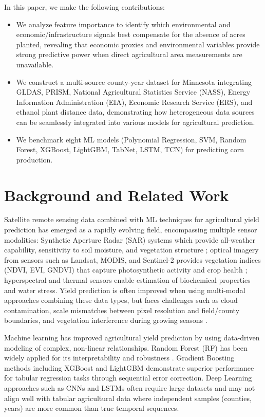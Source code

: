 \documentclass[twocolumn]{article}
\begin{document}
In this paper, we make the following contributions:
\begin{itemize}
    \item We analyze feature importance to identify which environmental and economic/infrastructure signals best compensate for the absence of acres planted, revealing that economic proxies and environmental variables provide strong predictive power when direct agricultural area measurements are unavailable.
    \item We construct a multi-source county-year dataset for Minnesota integrating GLDAS, PRISM, National Agricultural Statistics Service (NASS), Energy Information Administration (EIA), Economic Research Service (ERS), and ethanol plant distance data, demonstrating how heterogeneous data sources can be seamlessly integrated into various models for agricultural prediction.
    \item We benchmark eight ML models (Polynomial Regression, SVM, Random Forest, XGBoost, LightGBM, TabNet, LSTM, TCN) for predicting corn production.
\end{itemize}

\section{Background and Related Work}

Satellite remote sensing data combined with ML techniques for agricultural yield prediction has emerged as a rapidly evolving field, encompassing multiple sensor modalities: Synthetic Aperture Radar (SAR) systems which provide all-weather capability, sensitivity to soil moisture, and vegetation structure \cite{roy2025, sentinel2025}; optical imagery from sensors such as Landsat, MODIS, and Sentinel-2 provides vegetation indices (NDVI, EVI, GNDVI) that capture photosynthetic activity and crop health \cite{kayad2019}; hyperspectral and thermal sensors enable estimation of biochemical properties and water stress. Yield prediction is often improved when using multi-modal approaches combining these data types, but faces challenges such as cloud contamination, scale mismatches between pixel resolution and field/county boundaries, and vegetation interference during growing seasons \cite{singh2025}.

Machine learning has improved agricultural yield prediction by using data-driven modeling of complex, non-linear relationships. Random Forest (RF) has been widely applied for its interpretability and robustness \cite{prasetyo2024}. Gradient Boosting methods including XGBoost \cite{chen2016} and LightGBM \cite{ke2017} demonstrate superior performance for tabular regression tasks through sequential error correction. Deep Learning approaches such as CNNs \cite{nevavuori2020, shahhosseini2021} and LSTMs often require large datasets and may not align well with tabular agricultural data where independent samples (counties, years) are more common than true temporal sequences.
\end{document}
